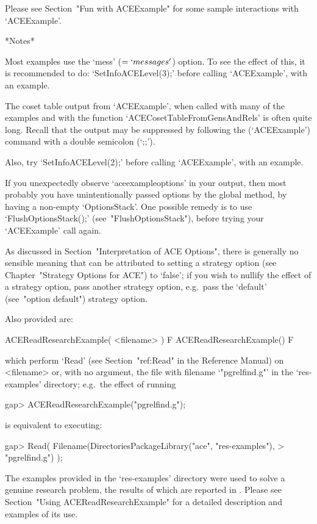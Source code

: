 Please see Section~"Fun with ACEExample" for some sample  interactions
with `ACEExample'.

*Notes*

Most examples use the `mess'  ($=  `messages'$)  option.  To  see  the
effect of this, it is recommended to do: `SetInfoACELevel(3);'  before
calling `ACEExample', with an example.

The coset table output from `ACEExample', when called with many of the
examples and with the {\ACE}  function  `ACECosetTableFromGensAndRels'
is often quite long. Recall that  the  output  may  be  suppressed  by
following the (`ACEExample') command with a double semicolon (`;;').

Also, try `SetInfoACELevel(2);' before  calling `ACEExample', with  an
example.

If you unexpectedly observe `aceexampleoptions' in your  output,  then
most probably you have unintentionally passed options  by  the  global
method, by having a non-empty `OptionsStack'. One possible  remedy  is
to use `FlushOptionsStack();' (see~"FlushOptionsStack"), before trying
your `ACEExample' call again.

As discussed in Section~"Interpretation  of  ACE  Options",  there  is
generally no sensible meaning that can  be  attributed  to  setting  a
strategy option (see Chapter~"Strategy Options for ACE")  to  `false';
if you wish to nullify the effect of a strategy option,  pass  another
strategy  option,  e.g.~pass  the  `default'  (see~"option   default")
strategy option.

Also provided are:

\> ACEReadResearchExample( <filename> ) F
\> ACEReadResearchExample() F

which perform `Read' (see Section~"ref:Read" in the  {\GAP}  Reference
Manual) on <filename> or, with no argument,  the  file  with  filename
`"pgrelfind.g"' in the `res-examples' directory;  e.g.~the  effect  of
running

\beginexample
gap> ACEReadResearchExample("pgrelfind.g");
\endexample

is equivalent to executing:

\beginexample
gap> Read( Filename(DirectoriesPackageLibrary("ace", "res-examples"),
>                   "pgrelfind.g") );
\endexample

The examples provided in the `res-examples'  directory  were  used  to
solve a genuine research problem, the results of which are reported in
\cite{CHHR01}. Please see Section~"Using  ACEReadResearchExample"  for
a detailed description and examples of its use.

